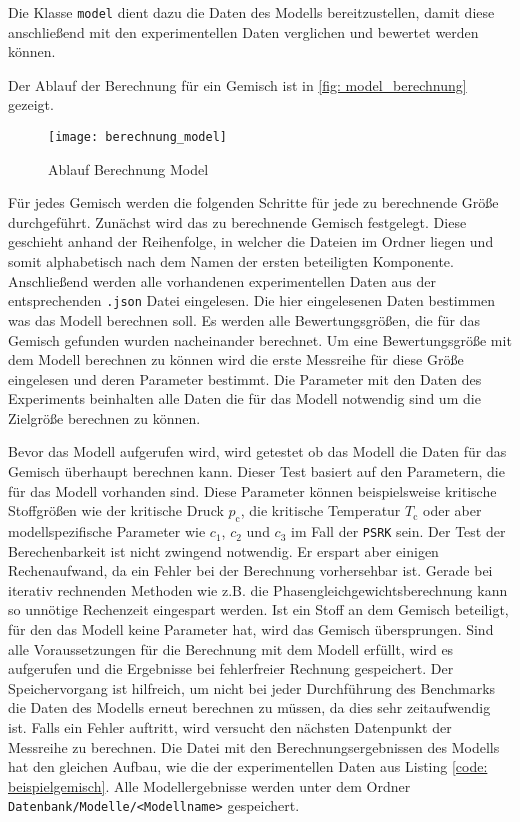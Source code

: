 \documentclass[../thesis.tex]{subfiles}
\begin{document}
Die Klasse \texttt{model} dient dazu die Daten des Modells bereitzustellen, damit diese anschließend mit den experimentellen Daten verglichen und bewertet werden können.

Der Ablauf der Berechnung für ein Gemisch ist in \autoref{fig: model_berechnung} gezeigt.

\begin{figure}[htb]
	\centering
	\texttt{[image: berechnung\_model]}
	\caption{Ablauf Berechnung Model}
	\label{fig: model_berechnung}
\end{figure}

Für jedes Gemisch werden die folgenden Schritte für jede zu berechnende Größe durchgeführt. Zunächst wird das zu berechnende Gemisch festgelegt. Diese geschieht anhand der Reihenfolge, in welcher die Dateien im Ordner liegen und somit alphabetisch nach dem Namen der ersten beteiligten Komponente. Anschließend werden alle vorhandenen experimentellen Daten aus der entsprechenden \texttt{.json} Datei eingelesen. Die hier eingelesenen Daten bestimmen was das Modell berechnen soll. Es werden alle Bewertungsgrößen, die für das Gemisch gefunden wurden nacheinander berechnet. Um eine Bewertungsgröße mit dem Modell berechnen zu können wird die erste Messreihe für diese Größe eingelesen und deren Parameter bestimmt. Die Parameter mit den Daten des Experiments beinhalten alle Daten die für das Modell notwendig sind um die Zielgröße berechnen zu können.

Bevor das Modell aufgerufen wird, wird getestet ob das Modell die Daten für das Gemisch überhaupt berechnen kann. Dieser Test basiert auf den Parametern, die für das Modell vorhanden sind. Diese Parameter können beispielsweise kritische Stoffgrößen wie der kritische Druck $p_\mathrm{c}$, die kritische Temperatur $T_\mathrm{c}$ oder aber modellspezifische Parameter wie $c_1$, $c_2$ und $c_3$ im Fall der \texttt{PSRK} sein. Der Test der Berechenbarkeit ist nicht zwingend notwendig. Er erspart aber einigen Rechenaufwand, da ein Fehler bei der Berechnung vorhersehbar ist. Gerade bei iterativ rechnenden Methoden wie z.B. die Phasengleichgewichtsberechnung kann so unnötige Rechenzeit eingespart werden. Ist ein Stoff an dem Gemisch beteiligt, für den das Modell keine Parameter hat, wird das Gemisch übersprungen.
Sind alle Voraussetzungen für die Berechnung mit dem Modell erfüllt, wird es aufgerufen und die Ergebnisse bei fehlerfreier Rechnung gespeichert. Der Speichervorgang ist hilfreich, um nicht bei jeder Durchführung des Benchmarks die Daten des Modells erneut berechnen zu müssen, da dies sehr zeitaufwendig ist. Falls ein Fehler auftritt, wird versucht den nächsten Datenpunkt der Messreihe zu berechnen. Die Datei mit den Berechnungsergebnissen des Modells hat den gleichen Aufbau, wie die der experimentellen Daten aus Listing \autoref{code: beispielgemisch}. Alle Modellergebnisse werden unter dem Ordner \texttt{Datenbank/Modelle/<Modellname>} gespeichert.
\end{document}
